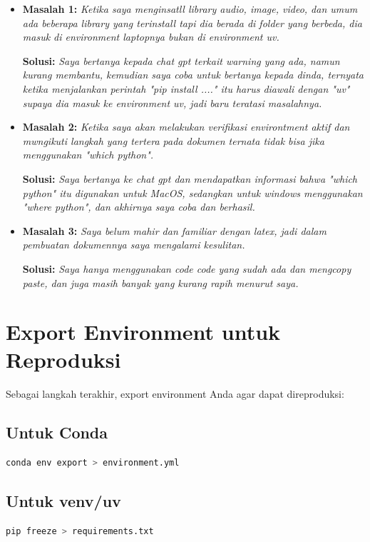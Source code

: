 \documentclass[11pt,a4paper]{article}
\begin{document}
\begin{itemize}
    \item \textbf{Masalah 1:} \textit{Ketika saya menginsatll library audio, image, video, dan umum ada beberapa library yang terinstall tapi dia berada di folder yang berbeda, dia masuk di environment laptopnya bukan di environment uv.}
    
    \textbf{Solusi:} \textit{Saya bertanya kepada chat gpt terkait warning yang ada, namun kurang membantu, kemudian saya coba untuk bertanya kepada dinda, ternyata ketika menjalankan perintah "pip install ...." itu harus diawali dengan "uv" supaya dia masuk ke environment uv, jadi baru teratasi masalahnya.}
    
    \item \textbf{Masalah 2:} \textit{Ketika saya akan melakukan verifikasi environtment aktif dan mwngikuti langkah yang tertera pada dokumen ternata tidak bisa jika menggunakan "which python".}
    
    \textbf{Solusi:} \textit{Saya bertanya ke chat gpt dan mendapatkan informasi bahwa "which python" itu digunakan untuk MacOS, sedangkan untuk windows menggunakan "where python", dan akhirnya saya coba dan berhasil.}

    \item \textbf{Masalah 3:} \textit{Saya belum mahir dan familiar dengan latex, jadi dalam pembuatan dokumennya saya mengalami kesulitan.}
    
    \textbf{Solusi:} \textit{Saya hanya menggunakan code code yang sudah ada dan mengcopy paste, dan juga masih banyak yang kurang rapih menurut saya.}
\end{itemize}

\section{Export Environment untuk Reproduksi}
Sebagai langkah terakhir, export environment Anda agar dapat direproduksi:

\subsection{Untuk Conda}
\begin{lstlisting}[language=bash, caption=Export conda environment]
conda env export > environment.yml
\end{lstlisting}

\subsection{Untuk venv/uv}
\begin{lstlisting}[language=bash, caption=Export pip requirements]
pip freeze > requirements.txt
\end{lstlisting}
\end{document}

